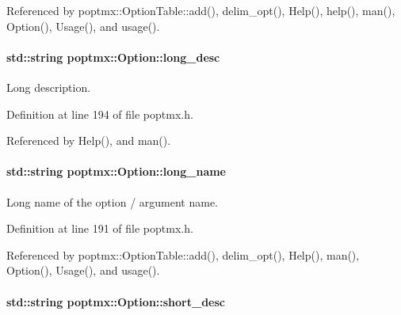 Referenced by poptmx::OptionTable::add(), delim\_\-opt(), Help(), help(), man(), Option(), Usage(), and usage().

\hypertarget{classpoptmx_1_1Option_a22d0ce433827d2ab6c427ff191fb1e51}{
\paragraph[{long\_\-desc}]{\setlength{\rightskip}{0pt plus 5cm}std::string {\bf poptmx::Option::long\_\-desc}}\hfill}
\label{classpoptmx_1_1Option_a22d0ce433827d2ab6c427ff191fb1e51}


Long description. 



Definition at line 194 of file poptmx.h.



Referenced by Help(), and man().

\hypertarget{classpoptmx_1_1Option_ac9b28f10c43af2e3afc9684e0ef19cc6}{
\paragraph[{long\_\-name}]{\setlength{\rightskip}{0pt plus 5cm}std::string {\bf poptmx::Option::long\_\-name}}\hfill}
\label{classpoptmx_1_1Option_ac9b28f10c43af2e3afc9684e0ef19cc6}


Long name of the option / argument name. 



Definition at line 191 of file poptmx.h.



Referenced by poptmx::OptionTable::add(), delim\_\-opt(), Help(), man(), Option(), Usage(), and usage().

\hypertarget{classpoptmx_1_1Option_a16b86218d90bf80a07dc6a49aa8afece}{
\paragraph[{short\_\-desc}]{\setlength{\rightskip}{0pt plus 5cm}std::string {\bf poptmx::Option::short\_\-desc}}\hfill}
\label{classpoptmx_1_1Option_a16b86218d90bf80a07dc6a49aa8afece}


